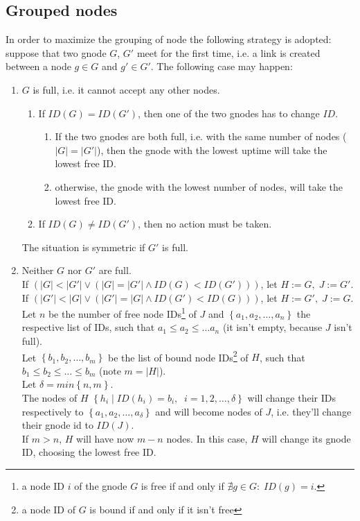 \documentclass[a4paper]{article}
\newcommand{\pgra}[1]{\left\{#1\right\}}
\newcommand{\pton}[1]{\left(#1\right)}
\begin{document}
\subsection{Grouped nodes}
\label{groupednodeshook}
In order to maximize the grouping of node the following strategy is adopted: suppose that two gnode
$G$, $G'$ meet for the first time, i.e. a link is created between a node $g\in
G$ and $g'\in G'$. The following case may happen:
\begin{enumerate}
	\item $G$ is full, i.e. it cannot accept any other nodes. 
		\begin{enumerate}
			\item	If
				$ID(G) = ID(G')$, then one of the two gnodes has to change
				$ID$. 
				\begin{enumerate}
					\item If the two gnodes are both full,
						i.e. with the same number of
						nodes ($|G|=|G'|$), then the
						gnode with the lowest uptime
						will take the lowest free ID.
					\item otherwise, the gnode with the lowest number of nodes, 
						will take the lowest free ID. 
				\end{enumerate}
			\item If $ID(G)\neq ID(G')$, then no action must be
				taken.
		\end{enumerate}
		The situation is symmetric if $G'$ is full.
	\item Neither $G$ nor $G'$ are full.\\
		If $\pton{ |G| < |G'| \lor  \pton{|G| = |G'| \land  ID(G) <
		ID(G')}}$, let $H:=G,\;J:=G'$.\\
		If $\pton{ |G'| < |G| \lor  \pton{|G'| = |G| \land  ID(G') <
		ID(G)}}$, let $H:=G',\;J:=G$.\\
		Let $n$ be the number of free node IDs\footnote{a node ID $i$ of
		the gnode $G$ is free if and only if $\nexists g\in
		G:\;ID(g)=i$.
		}
		of $J$  and 
		$\pgra{a_1,a_2,\dots,a_n}$ the respective list of IDs, such
		that $a_1\le a_2\le \dots a_n$ 
		(it isn't empty, because $J$ isn't full).\\
		Let $\pgra{b_1,b_2,\dots,b_m}$ be the list of bound node
		IDs\footnote{a node ID of $G$ is bound if and only if it
		isn't free}
		of $H$, such that $b_1\le b_2\le \dots\le b_m$ (note $m=|H|$).\\
		Let $\delta=min\pgra{n,m}$.\\
		The nodes of $H$
		$\pgra{h_i\;|\;ID(h_i)=b_i,\;\;i=1,2,\dots,\delta}$
		will change their IDs respectively to 
		$\pgra{a_1,a_2,\dots,a_\delta}$ and will become nodes of $J$,
		i.e. they'll change their gnode id to $ID(J)$.
		\\
		If $m>n$, $H$ will have now $m-n$ nodes. In this case, $H$
		will change its gnode ID, choosing the lowest free ID. 
\end{enumerate}
\end{document}
